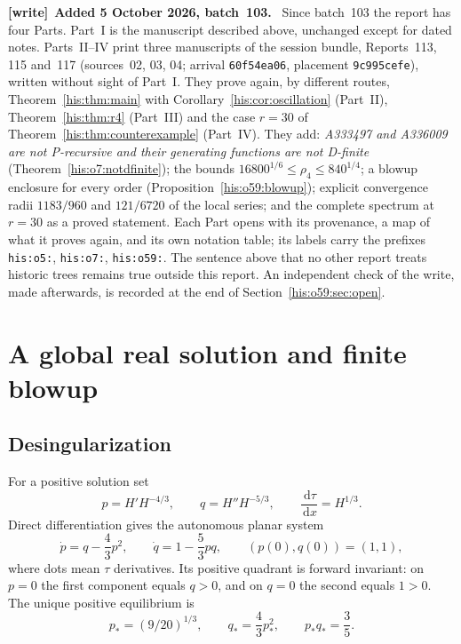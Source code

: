 \documentclass[11pt]{article}
\theoremstyle{remark}\newtheorem{remark}[theorem]{Remark}
\newcommand{\dd}{\,\mathrm d}
\numberwithin{equation}{section}
\newenvironment{writenote}[1][]{\par\smallskip\begingroup\small
 \noindent\textbf{[write]}\if\relax\detokenize{#1}\relax\else~\textbf{#1.}\fi\ }%
 {\par\endgroup\smallskip}
\begin{document}
\begin{writenote}[Added 5 October 2026, batch~103]
Since batch~103 the report has four Parts. Part~I is the manuscript described above, unchanged except for dated notes. Parts~II--IV print three manuscripts of the session bundle, Reports~113, 115 and~117 (sources~02, 03, 04; arrival \texttt{60f54ea06}, placement \texttt{9c995cefe}), written without sight of Part~I. They prove again, by different routes, Theorem~\ref{his:thm:main} with Corollary~\ref{his:cor:oscillation} (Part~II), Theorem~\ref{his:thm:r4} (Part~III) and the case $r=30$ of Theorem~\ref{his:thm:counterexample} (Part~IV). They add: \emph{A333497 and A336009 are not P-recursive and their generating functions are not D-finite} (Theorem~\ref{his:o7:notdfinite}); the bounds $16800^{1/6}\le\rho_4\le840^{1/4}$; a blowup enclosure for every order (Proposition~\ref{his:o59:blowup}); explicit convergence radii $1183/960$ and $121/6720$ of the local series; and the complete spectrum at $r=30$ as a proved statement. Each Part opens with its provenance, a map of what it proves again, and its own notation table; its labels carry the prefixes \texttt{his:o5:}, \texttt{his:o7:}, \texttt{his:o59:}. The sentence above that no other report treats historic trees remains true outside this report. An independent check of the write, made afterwards, is recorded at the end of Section~\ref{his:o59:sec:open}.
\end{writenote}


\section{A global real solution and finite blowup}\label{his:sec:real}
\subsection{Desingularization}
For a positive solution set
\begin{equation}\label{his:eq:coordinates}
 p=H'H^{-4/3},\qquad q=H''H^{-5/3},\qquad
 \frac{\dd\tau}{\dd x}=H^{1/3}.
\end{equation}
Direct differentiation gives the autonomous planar system
\begin{equation}\label{his:eq:planar}
 \dot p=q-\frac43p^2,\qquad
 \dot q=1-\frac53pq,\qquad (p(0),q(0))=(1,1),
\end{equation}
where dots mean $\tau$ derivatives. Its positive quadrant is forward invariant: on $p=0$ the first component equals $q>0$, and on $q=0$ the second equals $1>0$. The unique positive equilibrium is
\begin{equation}\label{his:eq:equilibrium}
 p_*=(9/20)^{1/3},\qquad q_*=\frac43p_*^2,
 \qquad p_*q_*=\frac35.
\end{equation}
\end{document}
